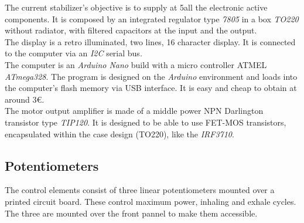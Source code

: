     The current stabilizer's objective is to supply at 5\Vcc all the electronic active components. It is composed by an integrated regulator type \textit{7805} in a box \textit{TO220} without radiator, with filtered capacitors at the input and the output.\\

    The display is a retro illuminated, two lines, 16 character display. It is connected to the computer via an \textit{I2C} serial bus.\\
    
    The computer is an \textit{Arduino Nano} build with a micro controller ATMEL \textit{ATmega328}. The program is designed on the \textit{Arduino} environment and loads into the computer's flash memory via USB interface. It is easy and cheap to obtain at around 3€.\\
    
    The motor output amplifier is made of a middle power NPN Darlington transistor type \textit{TIP120}. It is designed to be able to use FET-MOS transistors, encapsulated within the case design (TO220), like the \textit{IRF3710}.\\
    
\subsection{Potentiometers}
    The control elements consist of three linear potentiometers mounted over a printed circuit board. These control maximum power, inhaling and exhale cycles. The three are mounted over the front pannel to make them accessible.\\
    
